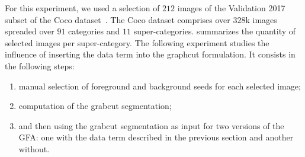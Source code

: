 \documentclass[review]{siamart220329}
\begin{document}
For this experiment, we used a selection of $212$ images of the Validation 2017
subset of the Coco dataset~\cite{lin2014microsoft}. The Coco dataset comprises
over $328$k images spreaded over $91$ categories and $11$ super-categories.
 summarizes the quantity of selected
images per super-category. 
%
%
The following experiment studies the influence of inserting the data term into
the graphcut formulation. It consists in the following steps:
%
%
\begin{enumerate}
    \item{manual selection of foreground and background seeds for each selected
    image;} 
    \item{computation of the grabcut segmentation;} 
    \item{and then using the grabcut segmentation as input for two versions of
    the GFA: one with the data term described in the previous section and
    another without.}
\end{enumerate}
%
%
\end{document}

